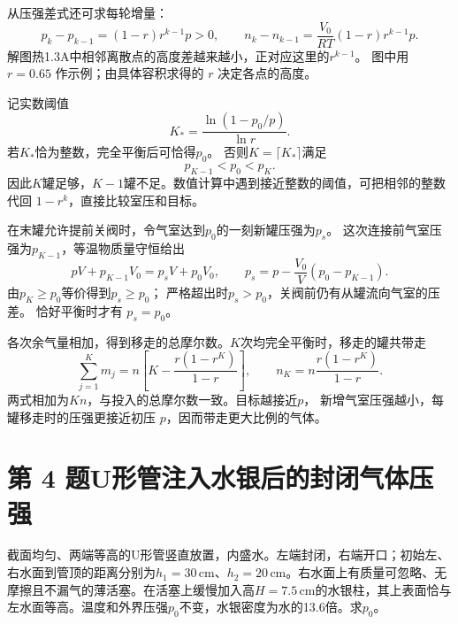 \documentclass[UTF8,fontset=fandol,a4paper,11pt]{ctexart}
\newcommand{\figcaption}[1]{\par\vspace{2pt}{\small\color{muted}#1}\par}
\begin{document}
从压强差式还可求每轮增量：
\[
p_k-p_{k-1}=(1-r)r^{k-1}p>0,\qquad
n_k-n_{k-1}=\frac{V_0}{RT}(1-r)r^{k-1}p.
\]
解图热1.3A中相邻离散点的高度差越来越小，正对应这里的$r^{k-1}$。
图中用 $r=0.65$ 作示例；由具体容积求得的 $r$ 决定各点的高度。

记实数阈值
\[
K_*=\frac{\ln(1-p_0/p)}{\ln r}.
\]
若$K_*$恰为整数，完全平衡后可恰得$p_0$。
否则$K=\lceil K_*\rceil$满足
\[
p_{K-1}<p_0<p_K.
\]
因此$K$罐足够，$K-1$罐不足。数值计算中遇到接近整数的阈值，可把相邻的整数代回 $1-r^k$，直接比较室压和目标。

在末罐允许提前关阀时，令气室达到$p_0$的一刻新罐压强为$p_s$。
这次连接前气室压强为$p_{K-1}$，等温物质量守恒给出
\[
pV+p_{K-1}V_0=p_sV+p_0V_0,\qquad
p_s=p-\frac{V_0}{V}(p_0-p_{K-1}).
\]
由$p_K\ge p_0$等价得到$p_s\ge p_0$；
严格超出时$p_s>p_0$，关阀前仍有从罐流向气室的压差。
恰好平衡时才有 $p_s=p_0$。

各次余气量相加，得到移走的总摩尔数。$K$次均完全平衡时，移走的罐共带走
\[
\sum_{j=1}^K m_j
=n\left[K-\frac{r(1-r^K)}{1-r}\right],
\qquad
n_K=n\frac{r(1-r^K)}{1-r}.
\]
两式相加为$Kn$，与投入的总摩尔数一致。目标越接近$p$，
新增气室压强越小，每罐移走时的压强更接近初压 $p$，因而带走更大比例的气体。




\section*{第 4 题\quad U形管注入水银后的封闭气体压强}

截面均匀、两端等高的U形管竖直放置，内盛水。左端封闭，右端开口；初始左、右水面到管顶的距离分别为$h_1=30\,\mathrm{cm}$、$h_2=20\,\mathrm{cm}$。右水面上有质量可忽略、无摩擦且不漏气的薄活塞。在活塞上缓慢加入高$H=7.5\,\mathrm{cm}$的水银柱，其上表面恰与左水面等高。温度和外界压强$p_0$不变，水银密度为水的13.6倍。求$p_0$。

\begin{center}\begin{minipage}{0.96\linewidth}\centering
{}\figcaption{图 热1.4　初始两水面的高度差决定封闭气体的初压。}\end{minipage}\end{center}
\end{document}
